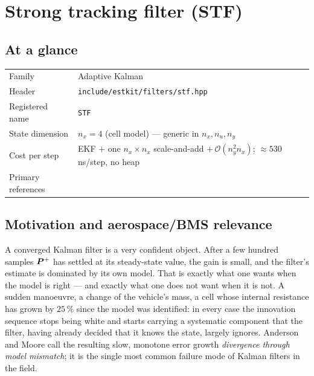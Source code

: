 \chapter{Strong tracking filter (STF)}
\label{ch:stf}

\section*{At a glance}
\begin{tabular}{@{}l>{\raggedright\arraybackslash}p{}@{}}
Family & Adaptive Kalman \\
Header & \texttt{include/estkit/filters/stf.hpp} \\
Registered name & \texttt{STF} \\
State dimension & $n_x = 4$ (cell model) --- generic in $n_x, n_u, n_y$ \\
Cost per step & EKF $+$ one $n_x\times n_x$ scale-and-add $+\,\mathcal{O}(n_y^2 n_x)$; $\approx 530$\,ns/step, no heap \\
Primary references & \cite{zhoufrank1996stf,xia1994adaptive,jwo2007fuzzy,simon2006,jazwinski1970} \\
\end{tabular}

\section{Motivation and aerospace/BMS relevance}
A converged Kalman filter is a very confident object.  After a few hundred samples $\bm{P}^{+}$ has
settled at its steady-state value, the gain is small, and the filter's estimate is dominated by its
own model.  That is exactly what one wants when the model is right --- and exactly what one does not
want when it is not.  A sudden manoeuvre, a change of the vehicle's mass, a cell whose internal
resistance has grown by $25\,\%$ since the model was identified: in every case the innovation
sequence stops being white and starts carrying a systematic component that the filter, having
already decided that it knows the state, largely ignores.  Anderson and Moore
\cite[Sec.~4.4]{andersonmoore1979} call the resulting slow, monotone error growth \emph{divergence
through model mismatch}; it is the single most common failure mode of Kalman filters in the field.

